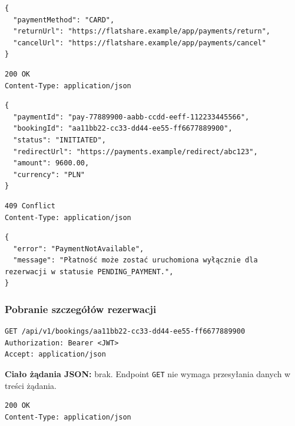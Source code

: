 \documentclass[11pt, a4paper]{article}
\begin{document}
\begin{lstlisting}[style=json,caption={Ciało żądania — inicjacja płatności}]
{
  "paymentMethod": "CARD",
  "returnUrl": "https://flatshare.example/app/payments/return",
  "cancelUrl": "https://flatshare.example/app/payments/cancel"
}
\end{lstlisting}

\begin{lstlisting}[style=http,caption={Odpowiedź HTTP — inicjacja płatności, sukces}]
200 OK
Content-Type: application/json
\end{lstlisting}

\begin{lstlisting}[style=json,caption={Ciało odpowiedzi — inicjacja płatności, sukces}]
{
  "paymentId": "pay-77889900-aabb-ccdd-eeff-112233445566",
  "bookingId": "aa11bb22-cc33-dd44-ee55-ff6677889900",
  "status": "INITIATED",
  "redirectUrl": "https://payments.example/redirect/abc123",
  "amount": 9600.00,
  "currency": "PLN"
}
\end{lstlisting}

\begin{lstlisting}[style=http,caption={Odpowiedź HTTP — inicjacja płatności, błąd}]
409 Conflict
Content-Type: application/json
\end{lstlisting}

\begin{lstlisting}[style=json,caption={Ciało odpowiedzi — inicjacja płatności, błąd}]
{
  "error": "PaymentNotAvailable",
  "message": "Płatność może zostać uruchomiona wyłącznie dla rezerwacji w statusie PENDING_PAYMENT.",
}
\end{lstlisting}

\subsubsection{Pobranie szczegółów rezerwacji}

\begin{lstlisting}[style=http,caption={Żądanie HTTP — pobranie szczegółów rezerwacji}]
GET /api/v1/bookings/aa11bb22-cc33-dd44-ee55-ff6677889900
Authorization: Bearer <JWT>
Accept: application/json
\end{lstlisting}

\noindent\textbf{Ciało żądania JSON:} brak. Endpoint \texttt{GET} nie wymaga przesyłania danych w treści żądania.

\begin{lstlisting}[style=http,caption={Odpowiedź HTTP — pobranie szczegółów rezerwacji, sukces}]
200 OK
Content-Type: application/json
\end{lstlisting}
\end{document}
